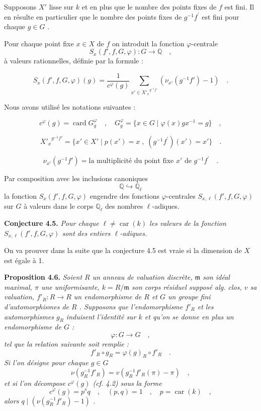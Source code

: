 \documentclass[11pt]{article}
\providecommand{\fm}{\mathfrak{m}}
\newcommand{\car}{\operatorname{car}}
\providecommand{\car}{\operatorname{car}}
\providecommand{\car}{\operatorname{car}}
\providecommand{\bQ}{\mathbb Q}
\providecommand{\fm}{\mathfrak m}
\providecommand{\card}{\operatorname{card}}
\providecommand{\car}{\operatorname{car}}
\begin{document}
Supposons $X'$ lisse sur $k$ et en plus que le nombre des points fixes de $f$ est fini. Il en résulte en particulier que le nombre des points fixes de $g^{-1}f^{\prime}$ est fini pour chaque $g \in G$ .

Pour chaque point fixe $x \in X$ de $f$ on introduit la fonction $\varphi$-centrale
\[
S_x(f',f,G,\varphi) : G \longrightarrow \bQ \quad ,
\]
à valeurs rationnelles, définie par la formule :

\begin{equation}\tag{4.1}
S_x(f',f,G,\varphi)(g) = \frac{1}{c^\varphi(g)} \sum_{x' \in {X'_x}^{g^{-1}f'}} (\nu_{x'}(g^{-1}f') - 1) \quad .
\end{equation}

Nous avons utilisé les notations suivantes :

\begin{equation}\tag{4.2}
c^\varphi(g) = \card G_g^\varphi \quad , \quad G_g^\varphi = \{ x \in G \mid \varphi(x)gx^{-1} = g \} \quad ,
\end{equation}

\begin{equation}\tag{4.3}
{X'_x}^{g^{-1}f'} = \{ x' \in X' \mid p(x') = x \; , \; (g^{-1}f^{\prime})(x') = x' \} \quad .
\end{equation}

\begin{equation}\tag{4.4}
\nu_{x'}(g^{-1}f') = \text{la multiplicité du point fixe } x' \text{ de } g^{-1}f^{\prime} \quad .
\end{equation}

Par composition avec les inclusions canoniques
\[
\bQ \hookrightarrow \bQ_\ell
\]
la fonction $S_x(f',f,G,\varphi)$ engendre des fonctions $\varphi$-centrales $S_{x,\ell}(f',f,G,\varphi)$ sur $G$ à valeurs dans le corps $\bQ_\ell$ des nombres $\ell$-adiques.

\medskip
\noindent
\textbf{Conjecture 4.5.} \emph{Pour chaque $\ell \neq \car(k)$ les valeurs de la fonction $S_{x,\ell}(f',f,G,\varphi)$ sont des entiers $\ell$-adiques.}

\medskip

On va prouver dans la suite que la conjecture 4.5 est vraie si la dimension de $X$ est égale à 1.

\medskip
\noindent
\textbf{Proposition 4.6.} \emph{Soient $R$ un anneau de valuation discrète, $\fm$ son idéal maximal, $\pi$ une uniformisante, $k = R/\fm$ son corps résiduel supposé alg. clos, $v$ sa valuation, $f'_R : R \to R$ un endomorphisme de $R$ et $G$ un groupe fini d'automorphismes de $R$ . Supposons que l'endomorphisme $f'_R$ et les automorphismes $g_R$ induisent l'identité sur $k$ et qu'on se donne en plus un endomorphisme de $G$ :
\[
\varphi : G \longrightarrow G \quad ,
\]
tel que la relation suivante soit remplie :
\[
f'_R \circ g_R = \varphi(g)_R \circ f'_R \quad .
\]
Si l'on désigne pour chaque $g \in G$
\[
\nu(g_R^{-1}f'_R) = v(g_R^{-1}f'_R(\pi) - \pi) \quad ,
\]
et si l'on décompose $c^\varphi(g)$ (cf. 4.2) sous la forme
\[
c^\varphi(g) = p^s q \quad , \quad (p,q) = 1 \quad , \quad p = \car(k) \quad ,
\]
alors $q \mid (\nu(g_R^{-1}f'_R) - 1)$ .}
\end{document}
